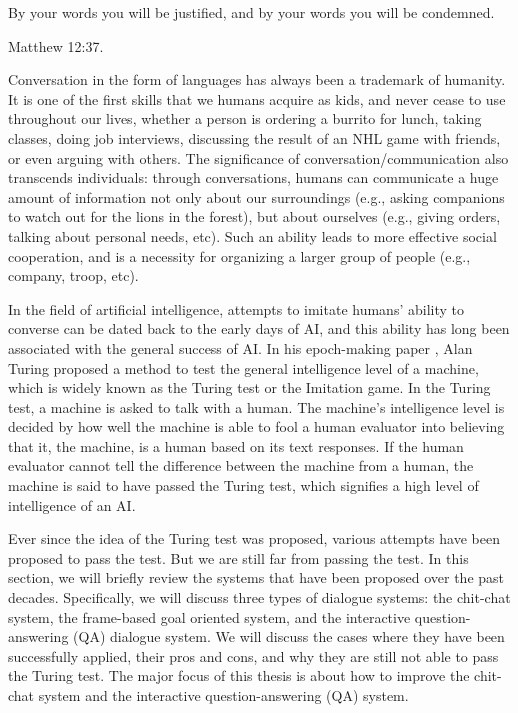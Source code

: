 \epigraph{By your words you will be justified, and by your words you will be condemned.}{Matthew 12:37.}
Conversation in the form of  languages has always been a trademark of humanity. 
It is one of the first skills that we humans acquire as kids, and never cease to use throughout our lives, whether 
 a person is ordering a burrito for lunch, taking classes, 
doing job interviews, discussing the result of an NHL game with friends, or even arguing with others. 
The significance of conversation/communication also transcends individuals: through conversations, humans can communicate a huge amount of information not only about
our surroundings (e.g., asking companions to watch out for the lions in the forest), but about ourselves (e.g., giving orders, talking about personal needs, etc). Such an ability leads to more effective social cooperation, and is a necessity for  
organizing a larger group of people (e.g., company, troop, etc). 

In the field of  artificial intelligence, attempts to imitate humans' ability to converse can be dated back to the early days of AI, and
this ability has long been 
associated with the general success of AI. 
In his epoch-making paper \cite{turing1950computing}, Alan Turing
proposed a method to test the general intelligence level of a machine, which is widely known as the Turing test or the Imitation game.
In the Turing test, 
 a machine is asked to 
talk with a human. The machine's intelligence level is decided by how well the machine is able to fool a human evaluator into believing that 
it, the machine, is a human based on its text responses. 
If the human evaluator cannot  tell the difference between the machine from a human, the machine is said to have passed the Turing test, which signifies a 
high level of intelligence of an AI.

Ever since the idea of the Turing test was proposed, various attempts have been proposed to pass the test. 
But we are still far from passing the test. 
In this section, we will briefly review the systems that have been proposed over the past decades.
Specifically, 
we will discuss 
three types of 
dialogue systems:  the chit-chat system, 
the frame-based goal oriented system, and
the interactive question-answering (QA) dialogue system. 
We will discuss the cases where they have been successfully applied, their pros and cons, and  why they are still not able to  pass the Turing test. 
The major focus of this thesis is about how to improve 
the chit-chat system and the interactive question-answering (QA) system. 

